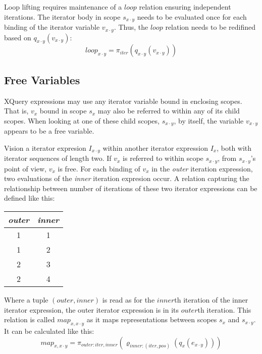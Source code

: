 Loop lifting requires maintenance of a $loop$ relation ensuring independent iterations. The iterator body in
scope $s_{x \cdot y}$ needs to be evaluated once for each binding of the iterator variable $v_{x \cdot y}$.
Thus, the $loop$ relation needs to be redifined based on $q_{x \cdot y}(v_{x \cdot y})$:
\begin{equation}
loop_{x \cdot y} = \pi_{iter}(q_{x \cdot y}(v_{x \cdot y}))
\label{eq:ll:loopxy}
\end{equation}


\subsection{Free Variables}
\label{sect:trans:ll:freeVar}

XQuery expressions may use any iterator variable bound in enclosing scopes. That is, $v_{x}$ bound in
scope $s_{x}$ may also be referred to within any of its child scopes. When looking at one of these child scopes,
$s_{x \cdot y}$, by itself, the variable $v_{x \cdot y}$ appears to be a free variable.

Vision a iterator expresion $I_{x \cdot y}$ within another iterator expression $I_{x}$, both with iterator
sequences of length two. If $v_{x}$ is referred to within scope $s_{x \cdot y}$, from $s_{x \cdot y}$'s point of
view, $v_{x}$ is free. For each binding of $v_{x}$ in the \textit{outer} iteration expression, two
evaluations of the \textit{inner} iteration expresion occur. A relation capturing the relationship between number
of iterations of these two iterator expressions can be defined like this:

\begin{center}
\begin{tabular}{|c|c|}\hline
\textit{outer}	& \textit{inner} 	\\ \hline
1				& 1		\\ \hline
1				& 2		\\ \hline
2				& 3		\\ \hline
2				& 4		\\ \hline
\end{tabular}
\end{center}

Where a tuple $(outer, inner)$ is read as for the $inner$th iteration of the inner iterator expression, the outer
iterator expression is in its $outer$th iteration. This relation is called $map_{x, x\cdot y}$ as it maps
representations between scopes $s_{x}$ and $s_{x \cdot y}$. It can be calculated like this:
\begin{equation}
map_{x, x\cdot y} = \pi_{outer:iter,inner}(\varrho_{inner:(iter,pos)}(q_{x}(e_{x \cdot y})))
\label{eq:ll:mapx_xy}
\end{equation}

